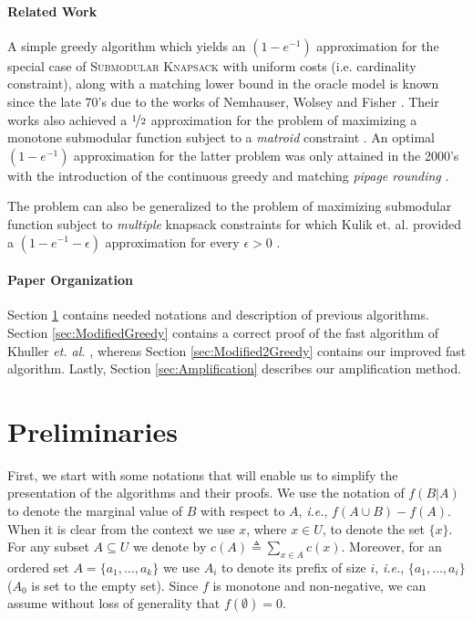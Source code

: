 \documentclass[a4paper,UKenglish,cleveref, autoref]{lipics-v2019}
\newcommand{\SK}{{\textsc{Submodular Knapsack}}\xspace}
\begin{document}
\paragraph*{Related Work}

A simple greedy algorithm which yields an $(1-e^{-1})$ approximation for the special
case of \SK with uniform costs (i.e. cardinality constraint), along with a matching 
lower bound in the oracle model is known since the late 70's due to the
works of Nemhauser, Wolsey and Fisher \cite{Nemhauser1978}\cite{NW78}.
Their works also achieved a $\nicefrac[]{1}{2}$ approximation for the problem
of maximizing a monotone submodular function subject to a {\em matroid}
constraint \cite{FNW78}. 
An optimal $(1-e^{-1})$ approximation for the latter problem was only attained in the 2000's with 
the introduction of the {continuous greedy} and matching 
	{\em pipage rounding } \cite{CCPV11}.

The problem can also be generalized to the problem of maximizing submodular function
subject to {\em multiple} knapsack constraints for which Kulik et. al. provided a $(1-e^{-1}-\epsilon)$ approximation for every $\epsilon>0$ \cite{KST13}.  


\paragraph*{Paper Organization}
Section \ref{sec:Preliminaries} contains needed notations and description of previous algorithms.
Section \ref{sec:ModifiedGreedy} contains a correct proof of the fast algorithm of Khuller {\em et. al.} \cite{khuller1999budgeted}, whereas Section \ref{sec:Modified2Greedy} contains our improved fast algorithm.
Lastly, Section \ref{sec:Amplification} describes our amplification method. 

\section{Preliminaries}\label{sec:Preliminaries}
First, we start with some notations that will enable us to simplify the presentation of the algorithms and their proofs.
We use the notation of $f(B|A)$ to denote the marginal value of $B$ with respect to $A$, {\em i.e.}, $f(A\cup B)-f(A)$.
When it is clear from the context we use $x$, where $x\in U$, to denote the set $\{ x\}$.
For any subset $A\subseteq U$ we denote by $c(A)\triangleq \sum _{x\in A}c(x)$.
Moreover, for an ordered set $A = \{a_1, \dots, a_k\}$ we use $A_i$ to denote its prefix of size $i$, {\em i.e.}, $\{a_1, \dots, a_i\}$ ($A_0$ is set to the empty set).
Since $f$ is monotone and non-negative, we can assume without loss of generality that $f(\emptyset)=0$.
\end{document}
